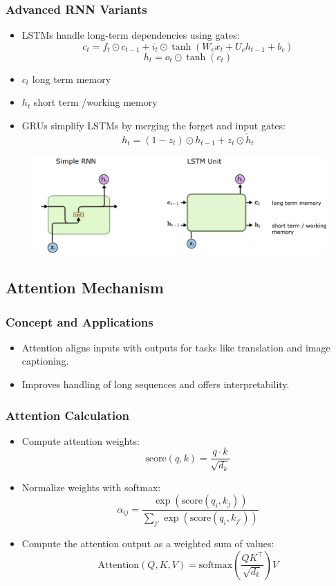 \subsubsection{Advanced RNN Variants}
\begin{itemize}
    \item LSTMs handle long-term dependencies using gates:
    \[
    c_t = f_t \odot c_{t-1} + i_t \odot \tanh(W_c x_t + U_c h_{t-1} + b_c)
    \]
    \[
    h_t = o_t \odot \tanh(c_t)
    \]
    \item \(c_t\) long term memory
    \item \(h_t\) short term /working memory
    \item GRUs simplify LSTMs by merging the forget and input gates:
    \[
    h_t = (1 - z_t) \odot h_{t-1} + z_t \odot \tilde{h}_t
    \]
\end{itemize}
\begin{figure}
    \includegraphics[width= \columnwidth]{figures/AttentionTransformer/RNNLSTM.png}
\end{figure}
\subsection{Attention Mechanism}
\subsubsection{Concept and Applications}
\begin{itemize}
    \item Attention aligns inputs with outputs for tasks like translation and image captioning.
    \item Improves handling of long sequences and offers interpretability.
\end{itemize}

\subsubsection{Attention Calculation}
\begin{itemize}
    \item Compute attention weights:
    \[
    \text{score}(q, k) = \frac{q \cdot k}{\sqrt{d_k}}
    \]
    \item Normalize weights with softmax:
    \[
    \alpha_{ij} = \frac{\exp(\text{score}(q_i, k_j))}{\sum_{j'} \exp(\text{score}(q_i, k_{j'}))}
    \]
    \item Compute the attention output as a weighted sum of values:
    \[
    \text{Attention}(Q, K, V) = \text{softmax}\left(\frac{QK^\top}{\sqrt{d_k}}\right)V
    \]
\end{itemize}

